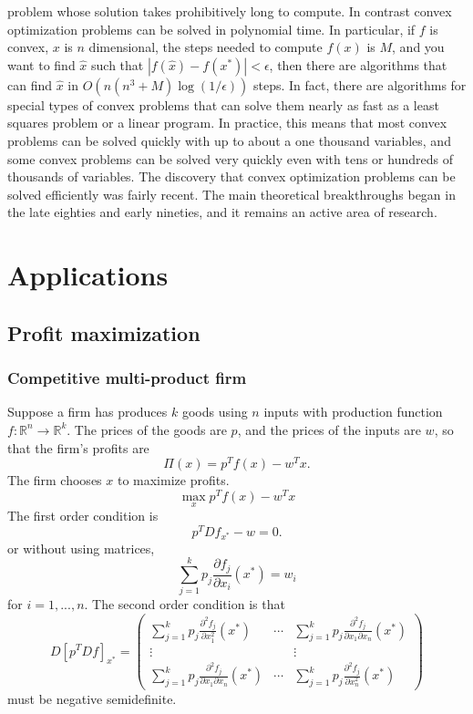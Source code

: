 \documentclass[12pt,reqno]{amsart}
\theoremstyle{definition}
\def\R{\mathbb{R}}
\newcommand{\abs}[1]{\left\vert {#1} \right\vert}
\renewcommand{\to}{{\rightarrow}}
\begin{document}
problem whose solution takes prohibitively long to compute. In
contrast convex optimization problems can be solved in polynomial
time. In particular, if $f$ is convex, $x$ is $n$ dimensional, the
steps needed to compute $f(x)$ is $M$, and you want to find $\hat{x}$
such that $\abs{f(\hat{x}) - f(x^\ast)} < \epsilon$, then there are
algorithms that can find $\hat{x}$ in
$O\left(n(n^3+M)\log(1/\epsilon)\right)$ steps. In fact, there are
algorithms for special types of convex problems that can solve them
nearly as fast as a least squares problem or a linear program. In
practice, this means that most convex problems can be solved quickly
with up to about a one thousand variables, and some convex problems
can be solved very quickly even with tens or hundreds of thousands of
variables. The discovery that convex optimization problems can be
solved efficiently was fairly recent. The main theoretical
breakthroughs began in the late eighties and early nineties, and it
remains an active area of research.

\section{Applications}

\subsection{Profit maximization}

\subsubsection{Competitive multi-product firm}
Suppose a firm has produces $k$ goods using $n$ inputs with production
function $f: \R^n \to \R^k$. The prices of the goods are $p$, and the
prices of the inputs are $w$, so that the firm's profits are 
\[ \Pi(x) =  p^T f(x) -  w^Tx. \]
The firm chooses $x$ to maximize profits.
\[ \max_x p^T f(x) - w^T x \]
The first order condition is
\[ p^T Df_{x^*} - w = 0. \]
or without using matrices,
\[ \sum_{j=1}^k p_j \frac{\partial f_j}{\partial x_i}(x^*) = w_i \]
for $i=1,..., n$. The second order condition is that 
\[ D[p^T Df]_{x^*} = \begin{pmatrix} \sum_{j=1}^k p_j \frac{\partial^2
    f_j}{\partial x_1^2}(x^*) & \cdots & \sum_{j=1}^k p_j \frac{\partial^2
    f_j}{\partial x_1\partial x_n}(x^*)  \\ \vdots & & \vdots \\
  \sum_{j=1}^k p_j \frac{\partial^2
    f_j}{\partial x_1\partial x_n}(x^*) & \cdots & \sum_{j=1}^k p_j
  \frac{\partial^2 f_j}{\partial x_n^2}(x^*) \end{pmatrix} 
\]
must be negative semidefinite. 
\end{document}

